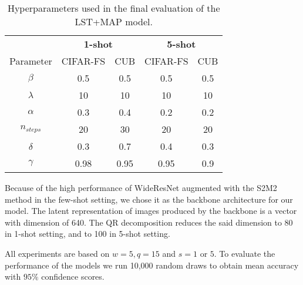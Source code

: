 \documentclass[letterpaper]{article} \usepackage{aaai20}  \usepackage{times}  \usepackage{helvet} \usepackage{courier}  \usepackage[hyphens]{url}  \usepackage{graphicx} \urlstyle{rm} \def\UrlFont{\rm}  \usepackage{graphicx}  \frenchspacing  \setlength{\pdfpagewidth}{8.5in}  \setlength{\pdfpageheight}{11in}  \usepackage[ruled,vlined]{algorithm2e}
\begin{document}
\begin{table}[]
\caption{Hyperparameters used in the final evaluation of the LST+MAP model.}
\vspace{5mm}
\label{tab:hyperparams}
\centering
\begin{tabular}{c|cc|cc}
\hline
         & \multicolumn{2}{c|}{\textbf{1-shot}} & \multicolumn{2}{c}{\textbf{5-shot}} \\ \cline{2-5} 
Parameter & CIFAR-FS            & CUB            & CIFAR-FS            & CUB            \\ \hline
$\beta$ & 0.5                 & 0.5            & 0.5                 & 0.5            \\ \hline
$\lambda$ & 10                 & 10            & 10                 & 10            \\ \hline
$\alpha$ & 0.3                 & 0.4            & 0.2                 & 0.2            \\ \hline
$n_{\textit{steps}}$ & 20                 & 30            & 20                 & 20            \\ \hline
$\delta$ & 0.3                 & 0.7            & 0.4                 & 0.3            \\ \hline
$\gamma$ & 0.98                & 0.95           & 0.95                & 0.9  \\ \hline         
\end{tabular}
\end{table}


Because of the high performance of WideResNet \cite{zagoruyko2017wide} augmented with the S2M2 method \cite{mangla2020charting} in the few-shot setting, we chose it as the backbone architecture for our model. The latent representation of images produced by the backbone is a vector with dimension of 640. The QR decomposition reduces the said dimension to 80 in 1-shot setting, and to 100 in 5-shot setting.

All experiments are based on $w=5,q=15$ and $s=1$ or $5$. To evaluate the performance of the models we run 10,000 random draws to obtain mean accuracy with $95\%$ confidence scores. 
\end{document}
